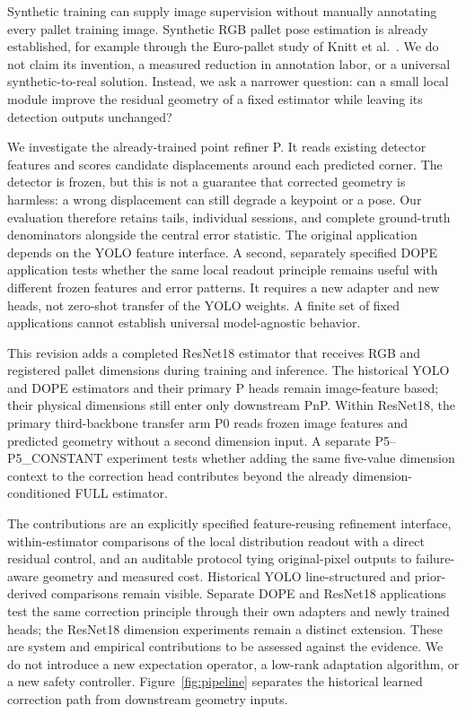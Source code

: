 \documentclass[journal]{IEEEtran}
\begin{document}
Synthetic training can supply image supervision without manually annotating every pallet training image. Synthetic RGB pallet pose estimation is already established, for example through the Euro-pallet study of Knitt et al.\ \cite{knitt}. We do not claim its invention, a measured reduction in annotation labor, or a universal synthetic-to-real solution. Instead, we ask a narrower question: can a small local module improve the residual geometry of a fixed estimator while leaving its detection outputs unchanged?

We investigate the already-trained point refiner P. It reads existing detector features and scores candidate displacements around each predicted corner. The detector is frozen, but this is not a guarantee that corrected geometry is harmless: a wrong displacement can still degrade a keypoint or a pose. Our evaluation therefore retains tails, individual sessions, and complete ground-truth denominators alongside the central error statistic. The original application depends on the YOLO feature interface. A second, separately specified DOPE application tests whether the same local readout principle remains useful with different frozen features and error patterns. It requires a new adapter and new heads, not zero-shot transfer of the YOLO weights. A finite set of fixed applications cannot establish universal model-agnostic behavior.

\ThirdEstimatorStatus{}

This revision adds a completed ResNet18 estimator that receives RGB and registered pallet dimensions during training and inference. The historical YOLO and DOPE estimators and their primary P heads remain image-feature based; their physical dimensions still enter only downstream PnP. Within ResNet18, the primary third-backbone transfer arm P0 reads frozen image features and predicted geometry without a second dimension input. A separate P5--P5\_CONSTANT experiment tests whether adding the same five-value dimension context to the correction head contributes beyond the already dimension-conditioned FULL estimator.

The contributions are an explicitly specified feature-reusing refinement interface, within-estimator comparisons of the local distribution readout with a direct residual control, and an auditable protocol tying original-pixel outputs to failure-aware geometry and measured cost. Historical YOLO line-structured and prior-derived comparisons remain visible. Separate DOPE and ResNet18 applications test the same correction principle through their own adapters and newly trained heads; the ResNet18 dimension experiments remain a distinct extension. These are system and empirical contributions to be assessed against the evidence. We do not introduce a new expectation operator, a low-rank adaptation algorithm, or a new safety controller. Figure~\ref{fig:pipeline} separates the historical learned correction path from downstream geometry inputs.
\end{document}
